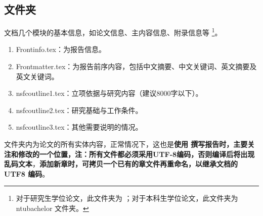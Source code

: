 \subsection{ \projectname 文件夹}
文档几个模块的基本信息，如论文信息、主内容信息、附录信息等 \footnote{对于研究生学位论文，此文件夹为 \projectname；对于本科生学位论文，此文件夹为 ntubachelor 文件夹。}。
\begin{enumerate}
    \item Frontinfo.tex：为报告信息。
    \item Frontmatter.tex：为报告前序内容，包括中文摘要、中文关键词、英文摘要及英文关键词。
    \item nsfcoutline1.tex：立项依据与研究内容（建议8000字以下）。
    \item nsfcoutline2.tex：研究基础与工作条件。
    \item nsfcoutline3.tex：其他需要说明的情况。
\end{enumerate}

文件夹内为论文的所有实体内容，正常情况下，这也是\textbf{使用 \projectname 撰写报告时，主要关注和修改的一个位置，注：所有文件都必须采用UTF-8编码，否则编译后将出现乱码文本}，\textbf{添加新章时，可拷贝一个已有的章文件再重命名，以继承文档的 UTF8 编码}。

